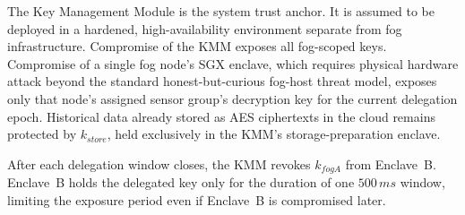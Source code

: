 \documentclass[conference]{IEEEtran}
\begin{document}
    The Key Management Module is the system trust anchor. It is assumed to be deployed in a hardened, high-availability environment separate from fog infrastructure. Compromise of the KMM exposes all fog-scoped keys. Compromise of a single fog node's SGX enclave, which requires physical hardware attack beyond the standard honest-but-curious fog-host threat model, exposes only that node's assigned sensor group's decryption key for the current delegation epoch. Historical data already stored as AES ciphertexts in the cloud remains protected by $k_{store}$, held exclusively in the KMM's storage-preparation enclave.

    After each delegation window closes, the KMM revokes $k_{fogA}$ from Enclave~B. Enclave~B holds the delegated key only for the duration of one $500\,ms$ window, limiting the exposure period even if Enclave~B is compromised later.
\end{document}
